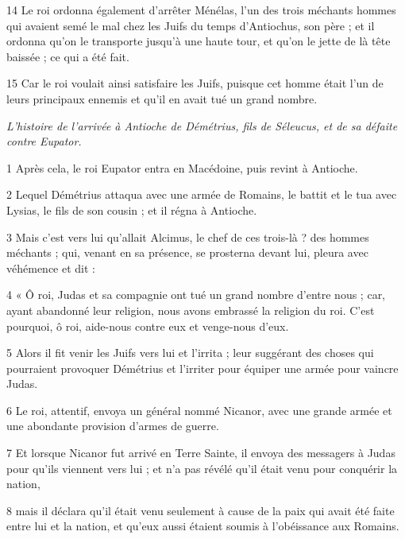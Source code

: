 \par 14 Le roi ordonna également d'arrêter Ménélas, l'un des trois méchants hommes qui avaient semé le mal chez les Juifs du temps d'Antiochus, son père ; et il ordonna qu'on le transporte jusqu'à une haute tour, et qu'on le jette de là tête baissée ; ce qui a été fait.

\par 15 Car le roi voulait ainsi satisfaire les Juifs, puisque cet homme était l'un de leurs principaux ennemis et qu'il en avait tué un grand nombre.


\par \textit{L'histoire de l'arrivée à Antioche de Démétrius, fils de Séleucus, et de sa défaite contre Eupator.}

\par 1 Après cela, le roi Eupator entra en Macédoine, puis revint à Antioche.

\par 2 Lequel Démétrius attaqua avec une armée de Romains, le battit et le tua avec Lysias, le fils de son cousin ; et il régna à Antioche.

\par 3 Mais c'est vers lui qu'allait Alcimus, le chef de ces trois-là ? des hommes méchants ; qui, venant en sa présence, se prosterna devant lui, pleura avec véhémence et dit :

\par 4 « Ô roi, Judas et sa compagnie ont tué un grand nombre d'entre nous ; car, ayant abandonné leur religion, nous avons embrassé la religion du roi. C'est pourquoi, ô roi, aide-nous contre eux et venge-nous d'eux.

\par 5 Alors il fit venir les Juifs vers lui et l'irrita ; leur suggérant des choses qui pourraient provoquer Démétrius et l'irriter pour équiper une armée pour vaincre Judas.

\par 6 Le roi, attentif, envoya un général nommé Nicanor, avec une grande armée et une abondante provision d'armes de guerre.

\par 7 Et lorsque Nicanor fut arrivé en Terre Sainte, il envoya des messagers à Judas pour qu'ils viennent vers lui ; et n'a pas révélé qu'il était venu pour conquérir la nation,

\par 8 mais il déclara qu'il était venu seulement à cause de la paix qui avait été faite entre lui et la nation, et qu'eux aussi étaient soumis à l'obéissance aux Romains.

